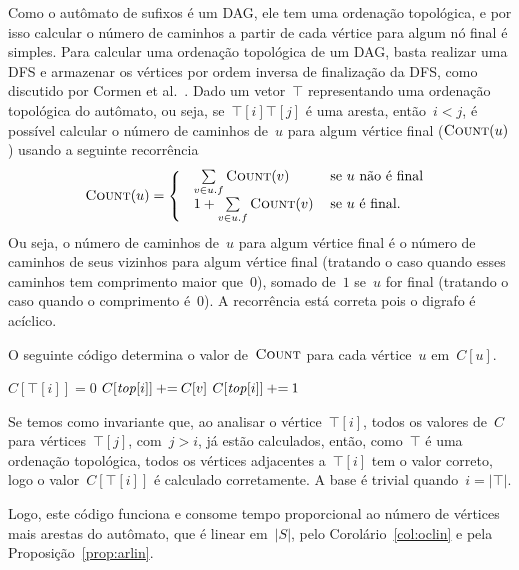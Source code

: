 Como o autômato de sufixos é um DAG, ele tem uma ordenação topológica, e por isso calcular o número de caminhos a partir de cada vértice para algum nó final é simples. Para calcular uma ordenação topológica de um DAG, basta realizar uma DFS e armazenar os vértices por ordem inversa de finalização da DFS, como discutido por Cormen et al.~\cite[Seção 22.4]{cormen}.
\newcommand{\Count}{\textsc{Count}}
Dado um vetor~$\top$ representando uma ordenação topológica do autômato, ou seja, se~$\top[i] \top[j]$ é uma aresta, então~${i < j}$, é possível calcular o número de caminhos de~$u$ para algum vértice final ($\Count(u)$) usando a seguinte recorrência
\[
\Count(u) =
\left \{
  \begin{tabular}{ll}
 ~$\sum\limits_{v \in u.f}{\Count(v)}$ & se~$u$ não é final \\
 ~$1 + \sum\limits_{v \in u.f}{\Count(v)}$ & se~$u$ é final.
  \end{tabular}
\right .
\]
Ou seja, o número de caminhos de~$u$ para algum vértice final é o número de caminhos de seus vizinhos para algum vértice final (tratando o caso quando esses caminhos tem comprimento maior que~$0$), somado de~$1$ se~$u$ for final (tratando o caso quando o comprimento é~$0$). A recorrência está correta pois o digrafo é acíclico.

O seguinte código determina o valor de~$\Count$ para cada vértice~$u$ em~$C[u]$.

\begin{algorithm}
\begin{algorithmic}[1]
    \State $C[\top[i]] = 0$
        \State $C[\mathit{top}[i]] \mathbin{{\tiny +}{=}} C[v]$
    \EndFor
        \State $C[\mathit{top}[i]] \mathbin{{\tiny +}{=}} 1$
    \EndIf
\EndFor
\end{algorithmic}
\end{algorithm}

Se temos como invariante que, ao analisar o vértice~$\top[i]$, todos os valores de~$C$ para vértices~$\top[j]$, com~${j > i}$, já estão calculados, então, como~$\top$ é uma ordenação topológica, todos os vértices adjacentes a~$\top[i]$ tem o valor correto, logo o valor~$C[\top[i]]$ é calculado corretamente. A base é trivial quando~$i = |\top|$.

Logo, este código funciona e consome tempo proporcional ao número de vértices mais arestas do autômato, que é linear em~$|S|$, pelo Corolário~\ref{col:oclin} e pela Proposição~\ref{prop:arlin}.